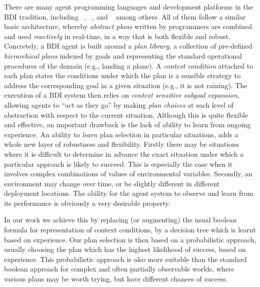 There are many agent programming languages and development platforms
in the BDI tradition, including
\JACK~\cite{BusettaRHL:AL99-JACK}, 
\JADEX~\cite{PokahrBL:EXP03-JADEX}, and
\JASON~\cite{jasonbook}
among others. 
All of them
follow a similar basic architecture, whereby \emph{abstract plans}
written by programmers are combined and used \emph{reactively} in
real-time, in a way that is both flexible and robust. Concretely, a
BDI agent is built around a \textit{plan library}, a collection of
pre-defined \textit{hierarchical plans} indexed by goals and
representing the standard operational procedures of the domain (e.g.,
landing a plane).
%
A \emph{context condition} attached to each plan states the
conditions under which the plan is a sensible strategy to address the
corresponding goal in a given situation (e.g., it is not raining). The execution
of a BDI system then relies on \textit{context sensitive subgoal
expansion}, allowing agents to ``act as they go'' by making \emph{plan choices}
at each level of abstraction with respect to the current situation.
%
Although this is quite flexible and effective, an important drawback
is the lack of ability to learn from ongoing experience. An ability to
{\it learn} plan selection in particular situations,
adds a whole new layer of robustness and flexibility. Firstly there
may be situations where it is difficult to determine in advance the
exact situation under which a particular approach is likely to
succeed. This is especially the case when it involves complex combinations of
values of environmental variables. Secondly, an environment may change
over time, or be slightly different in different deployment
locations. The ability for the agent system to observe and learn
from its performance is obviously a very desirable property.

In our work we achieve this by replacing (or augmenting) the usual
boolean formula for representation of context conditions, by a
decision tree \cite{Mitchell97:ML} which is learnt based on
experience. Our plan selection is then based on a probabilistic
approach, usually choosing the plan which has the highest likelihood
of success, based on experience. This probabilistic approach is also
more suitable than the standard boolean approach for complex and often
partially observable worlds, where various plans may be worth trying,
but have different chances of success.

